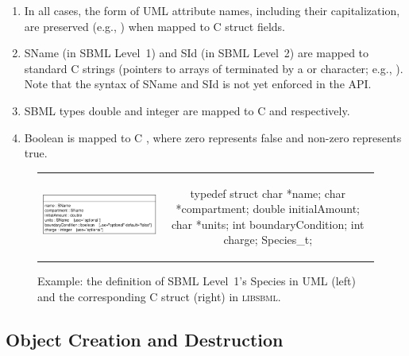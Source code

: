 \documentclass{sbmlmanual}
\newcommand{\libsbml}{\textsc{libsbml}}
\begin{document}
\begin{enumerate}
  
  \item In all cases, the form of UML attribute names, including their
  capitalization, are preserved (e.g., ) when
  mapped to C struct fields.
  
\item SName (in SBML Level~1) and SId (in SBML Level~2) are mapped to
  standard C strings (pointers to arrays of  terminated by a
   or  character; e.g., ).  Note that
  the syntax of SName and SId is not yet enforced in the API.
  
\item SBML types double and integer are mapped to C  and
   respectively.
  
\item Boolean is mapped to C , where zero represents false and
  non-zero represents true.

\end{enumerate}
\begin{figure}[bht]
  \begin{tabular}{m{8.5cm}c}
    \includegraphics[scale=0.68]{species}
    &
    \begin{example}[c]
typedef struct { 
  char    *name;
  char    *compartment;
  double  initialAmount;
  char    *units;
  int     boundaryCondition;
  int     charge;
} Species_t;
    \end{example}\\
  \end{tabular}
  \caption{Example: the definition of SBML Level~1's Species in UML (left) and the
    corresponding  C struct (right) in \libsbml{}.}
  \label{fig:species-uml-and-c}
\end{figure}


\subsection{Object Creation and Destruction}
\end{document}

